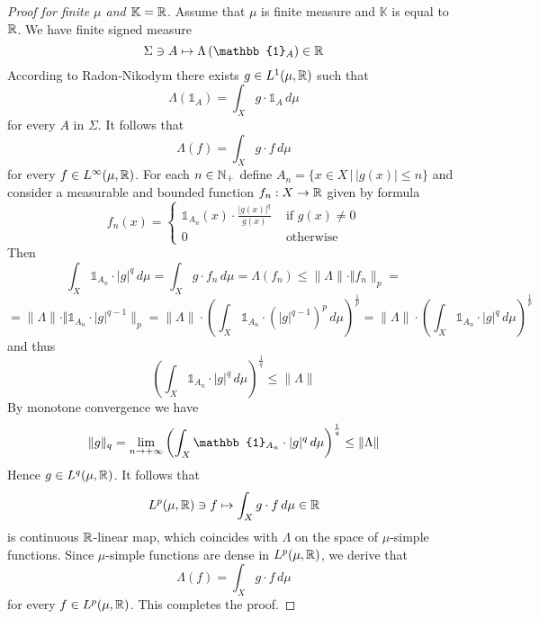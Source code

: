 \begin{proof}[Proof for finite $\mu$ and $\mathbb{K}={\mathbb R}$]
Assume that $\mu$ is finite measure and $\mathbb{K}$ is equal to ${\mathbb R}$. We have finite signed measure
$$\Sigma \ni A \mapsto  \Lambda\left(\mathbb{1}_A\right) \in \RR$$
According to Radon-Nikodym there exists $g \in L^1(\mu,{\mathbb R})$ such that
$$\Lambda\left(\mathbb{1}_A\right) = \int_Xg\cdot \mathbb{1}_A\,d\mu$$
for every $A$ in $\Sigma$. It follows that
$$\Lambda(f) = \int_Xg\cdot f\,d\mu$$
for every $f \in L^{\infty}(\mu,{\mathbb R})$. For each $n \in {\mathbb N}_+$ define $A_n = \big\{x\in X\,\big|\,|g(x)|\leq n\big\}$ and consider a measurable and bounded function $f_n:X\rightarrow {\mathbb R}$ given by formula
$$f_n(x) = \begin{cases}
\mathbb{1}_{A_n}(x)\cdot \frac{|g(x)|^q}{g(x)}&\mbox{ if }g(x) \neq 0\\
0&\mbox{ otherwise }  
\end{cases}
$$
Then
$$\int_X \mathbb{1}_{A_n} \cdot |g|^{q}\,d\mu = \int_X g \cdot f_n\,d\mu = \Lambda\left(f_n\right) \leq \lVert \Lambda \rVert\cdot \Vert f_n \rVert_p = $$
$$= \lVert \Lambda \rVert\cdot \Vert \mathbb{1}_{A_n}\cdot |g|^{q-1}\rVert_p = \lVert \Lambda \rVert\cdot \left(\int_X \mathbb{1}_{A_n}\cdot\left(|g|^{q-1}\right)^p\,d\mu\right)^{\frac{1}{p}} = \lVert \Lambda \rVert\cdot \left(\int_X \mathbb{1}_{A_n}\cdot |g|^{q}\,d\mu\right)^{\frac{1}{p}}$$
and thus
$$\left(\int_X \mathbb{1}_{A_n} \cdot |g|^{q}\,d\mu\right)^{\frac{1}{q}} \leq \lVert \Lambda \rVert$$
By monotone convergence we have
$$\lVert g \rVert_q = \lim_{n\ra +\infty}\left(\int_X \mathbb{1}_{A_n} \cdot |g|^{q}\,d\mu\right)^{\frac{1}{q}} \leq \lVert \Lambda \rVert$$
Hence $g \in L^q(\mu,{\mathbb R})$. It follows that 
$$L^p(\mu,{\mathbb R}) \ni f \mapsto \int_{X}g\cdot f\,d\mu \in {\mathbb R}$$
is continuous ${\mathbb R}$-linear map, which coincides with $\Lambda$ on the space of $\mu$-simple functions. Since $\mu$-simple functions are dense in $L^p(\mu,{\mathbb R})$, we derive that
$$\Lambda(f) = \int_{X}g\cdot f\,d\mu$$
for every $f \in L^p(\mu,{\mathbb R})$. This completes the proof.
\end{proof}

